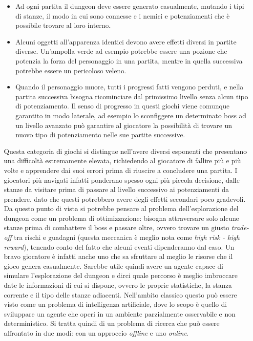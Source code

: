 \documentclass{book}
\theoremstyle{definition}
\theoremstyle{definition}
\theoremstyle{definition}
\theoremstyle{plain}
\theoremstyle{plain}
\theoremstyle{plain}
\theoremstyle{plain}
\begin{document}
\begin{itemize}
    \item Ad ogni partita il dungeon deve essere generato casualmente, mutando i tipi di stanze, il modo in cui sono connesse e i nemici e potenziamenti che è possibile trovare al loro interno.
    \item Alcuni oggetti all'apparenza identici devono avere effetti diversi in partite diverse. Un'ampolla verde ad esempio potrebbe essere una pozione che potenzia la forza del personaggio in una partita, mentre in quella successiva potrebbe essere un pericoloso veleno.
    \item Quando il personaggio muore, tutti i progressi fatti vengono perduti, e nella partita successiva bisogna ricominciare dal primissimo livello senza alcun tipo di potenziamento. Il senso di progresso in questi giochi viene comunque garantito in modo laterale, ad esempio lo sconfiggere un determinato boss ad un livello avanzato può garantire al giocatore la possibilità di trovare un nuovo tipo di potenziamento nelle sue partite successive.
\end{itemize}
Questa categoria di giochi si distingue nell'avere diversi esponenti che presentano una difficoltà estremamente elevata, richiedendo al giocatore di fallire più e più volte e apprendere dai suoi errori prima di riuscire a concludere una partita. I giocatori più navigati infatti ponderano spesso ogni più piccola decisione, dalle stanze da visitare prima di passare al livello successivo ai potenziamenti da prendere, dato che questi potrebbero avere degli effetti secondari poco gradevoli. Da questo punto di vista si potrebbe pensare al problema dell'esplorazione del dungeon come un problema di ottimizzazione: bisogna attraversare solo alcune stanze prima di combattere il boss e passare oltre, ovvero trovare un giusto \textit{trade-off} tra rischi e guadagni (questa meccanica è meglio nota come \textit{high risk - high reward}), tenendo conto del fatto che alcuni eventi dipenderanno dal caso. Un bravo giocatore è infatti anche uno che sa sfruttare al meglio le risorse che il gioco genera casualmente.
Sarebbe utile quindi avere un agente capace di simulare l'esplorazione del dungeon e dirci quale percorso è meglio imbroccare date le informazioni di cui si dispone, ovvero le proprie statistiche, la stanza corrente e il tipo delle stanze adiacenti. Nell'ambito classico questo può essere visto come un problema di intelligenza artificiale, dove lo scopo è quello di sviluppare un agente che operi in un ambiente parzialmente osservabile e non deterministico. Si tratta quindi di un problema di ricerca che può essere affrontato in due modi: con un approccio \textit{offline} e uno \textit{online}. \\
\end{document}
